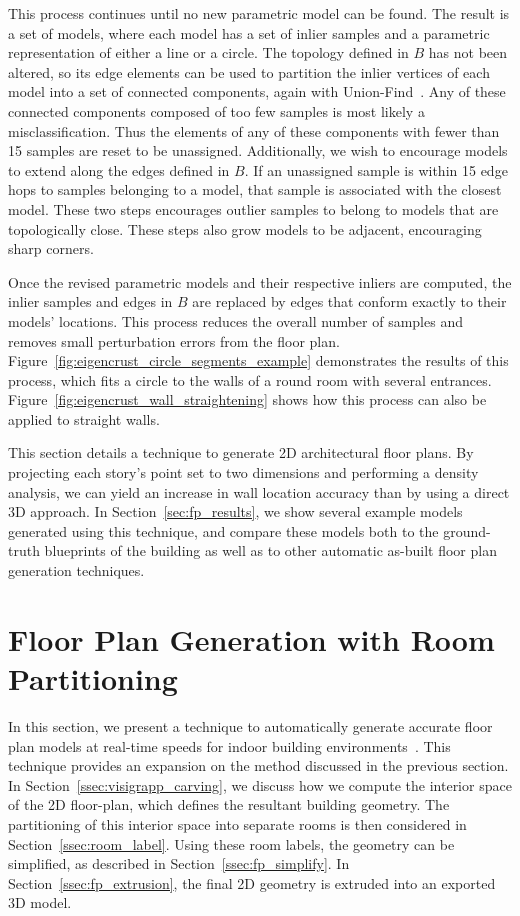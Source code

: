 \documentclass[12pt,onecolumn,oneside]{book}
\begin{document}
This process continues until no new parametric model can be found.  The result is a set of models, where each model has a set of inlier samples and a parametric representation of either a line or a circle.  The topology defined in $B$ has not been altered, so its edge elements can be used to partition the inlier vertices of each model into a set of connected components, again with Union-Find~\cite{Unionfind}.  Any of these connected components composed of too few samples is most likely a misclassification.  Thus the elements of any of these components with fewer than 15 samples are reset to be unassigned.  Additionally, we wish to encourage models to extend along the edges defined in $B$.  If an unassigned sample is within 15 edge hops to samples belonging to a model, that sample is associated with the closest model.  These two steps encourages outlier samples to belong to models that are topologically close.  These steps also grow models to be adjacent, encouraging sharp corners.

Once the revised parametric models and their respective inliers are computed, the inlier samples and edges in $B$ are replaced by edges that conform exactly to their models' locations.  This process reduces the overall number of samples and removes small perturbation errors from the floor plan.  Figure~\ref{fig:eigencrust_circle_segments_example} demonstrates the results of this process, which fits a circle to the walls of a round room with several entrances. Figure~\ref{fig:eigencrust_wall_straightening} shows how this process can also be applied to straight walls.

This section details a technique to generate 2D architectural floor plans.  By projecting each story's point set to two dimensions and performing a density analysis, we can yield an increase in wall location accuracy than by using a direct 3D approach. In Section~\ref{sec:fp_results}, we show several example models generated using this technique, and compare these models both to the ground-truth blueprints of the building as well as to other automatic as-built floor plan generation techniques.

\section{Floor Plan Generation with Room Partitioning}
\label{sec:visigrapp}

In this section, we present a technique to automatically generate accurate floor plan models at real-time speeds for indoor building environments~\cite{Turner14}.  This technique provides an expansion on the method discussed in the previous section.  In Section~\ref{ssec:visigrapp_carving}, we discuss how we compute the interior space of the 2D floor-plan, which defines the resultant building geometry.  The partitioning of this interior space into separate rooms is then considered in Section~\ref{ssec:room_label}.  Using these room labels, the geometry can be simplified, as described in Section~\ref{ssec:fp_simplify}.  In Section~\ref{ssec:fp_extrusion}, the final 2D geometry is extruded into an exported 3D model.
\end{document}
